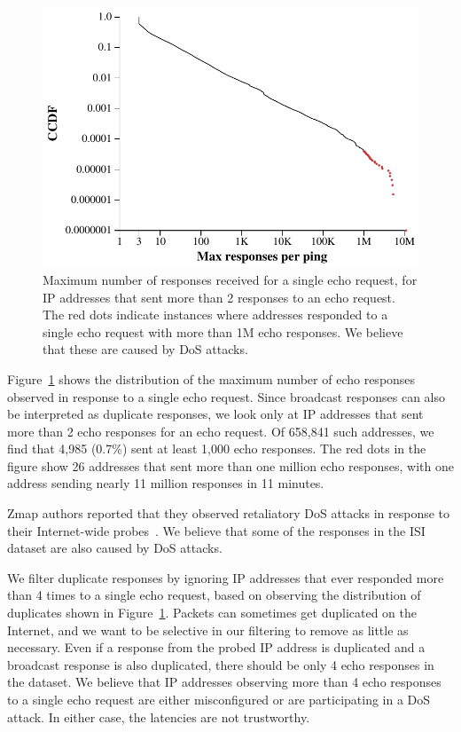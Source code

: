 \begin{figure}[tb]
\begin{center}
\includegraphics[width=.9\linewidth]{timeouts/figs/ccdf_dos}
\end{center}
\caption{\label{fig:dos}%
Maximum number of responses received for a single echo request, for IP
addresses that sent more than 2 responses to an echo request. The red
dots indicate instances where addresses responded to a single echo
request with more than 1M echo responses. We believe that these are
caused by DoS attacks.}
\end{figure}

Figure~\ref{fig:dos} shows the distribution of the maximum number of
echo responses observed in response to a single echo request. Since
broadcast responses can also be interpreted as duplicate responses, we
look only at IP addresses that sent more than 2 echo responses for an
echo request. Of 658,841 such addresses, we find that 4,985 (0.7\%) sent
at least 1,000 echo responses. The red dots in the figure show 26
addresses that sent more than one million echo
responses, with one address sending nearly 11 million responses in 11 minutes.

Zmap authors reported that they observed
retaliatory DoS attacks
in response to their Internet-wide probes~\cite{durumeric2013zmap}. We believe that
some of the responses in the ISI dataset are also caused by DoS attacks.

We filter duplicate responses by ignoring IP addresses that ever
responded more than 4 times to a single echo request, based on observing the
distribution of duplicates shown in Figure~\ref{fig:dos}.  Packets can
sometimes get duplicated on the Internet, and we want to be selective
in our filtering to remove as little as necessary.  Even if a response from
the probed IP address is duplicated and a broadcast response is also
duplicated, there should be only 4 echo responses in the dataset. We
believe that IP addresses observing more than 4 echo responses to a
single echo request are either misconfigured or are participating in a DoS attack.
In either case, the latencies are not trustworthy.

